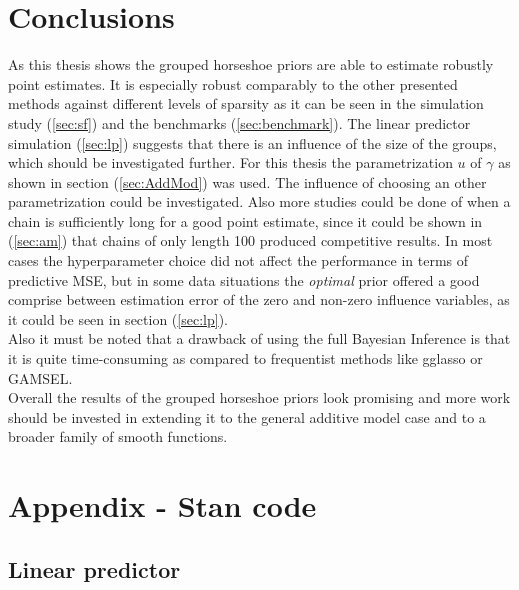 \documentclass[12pt,letterpaper]{article}
\numberwithin{equation}{subsection}
\begin{document}
\section{Conclusions}
As this thesis shows the grouped horseshoe priors are able to estimate robustly point estimates. It is especially robust comparably to the other presented methods against different levels of sparsity as it can be seen in the simulation study (\ref{sec:sf}) and the benchmarks (\ref{sec:benchmark}).
The linear predictor simulation (\ref{sec:lp}) suggests that there is an influence of the size of the groups, which should be investigated further. For this thesis the parametrization $u$ of $\gamma$ as shown in section (\ref{sec:AddMod}) was used. The influence of choosing an other parametrization could be investigated. Also more studies could be done of when a chain is sufficiently long for a good point estimate, since it could be shown in (\ref{sec:am}) that chains of only length 100 produced competitive results. In most cases the hyperparameter choice did not affect the performance in terms of predictive MSE, but in some data situations the \textit{optimal} prior offered a good comprise between estimation error of the zero and non-zero influence variables, as it could be seen in section (\ref{sec:lp}).\\
Also it must be noted that a drawback of using the full Bayesian Inference is that it is quite time-consuming as compared to frequentist methods like gglasso or GAMSEL.  \\
Overall the results of the grouped horseshoe priors look promising and more work should be invested in extending it to the general additive model case and to a broader family of smooth functions. 
\pagebreak
\section{Appendix - Stan code} 
\subsection{Linear predictor}

\pagebreak
\end{document}
